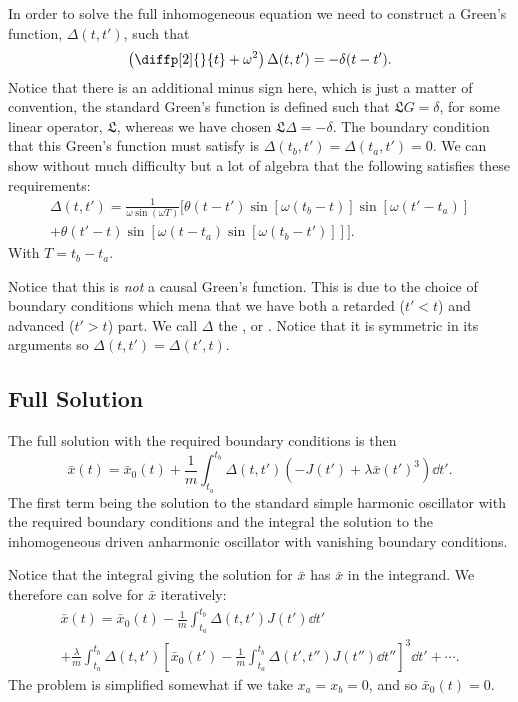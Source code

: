 \documentclass[fleqn]{NotesClass}
\begin{document}
    In order to solve the full inhomogeneous equation we need to construct a Green's function, \(\Delta(t, t')\), such that
    \begin{equation}
        \left( \diffp[2]{}{t} + \omega^2 \right)\Delta(t, t') = -\delta(t - t').
    \end{equation}
    Notice that there is an additional minus sign here, which is just a matter of convention, the standard Green's function is defined such that \(\mathfrak{L}G = \delta\), for some linear operator, \(\mathfrak{L}\), whereas we have chosen \(\mathfrak{L}\Delta = -\delta\).
    The boundary condition that this Green's function must satisfy is \(\Delta(t_b, t') = \Delta(t_a, t') = 0\).
    We can show without much difficulty but a lot of algebra that the following satisfies these requirements:
    \begin{multline}\label{eqn:driven SHO Greens function}
        \Delta(t, t') = \frac{1}{\omega\sin(\omega T)} [\theta(t - t')\sin[\omega(t_b - t)]\sin[\omega(t' - t_a)]\\
        + \theta(t' - t)\sin[\omega(t - t_a)\sin[\omega(t_b - t')]]].
    \end{multline}
    With \(T = t_b - t_a\).
    
    Notice that this is \emph{not} a causal Green's function.
    This is due to the choice of boundary conditions which mena that we have both a retarded (\(t' < t\)) and advanced (\(t' > t\)) part.
    We call \(\Delta\) the , or .
    Notice that it is symmetric in its arguments so \(\Delta(t, t') = \Delta(t', t)\).
    
    \subsection{Full Solution}
    The full solution with the required boundary conditions is then
    \begin{equation}
        \bar{x}(t)= \bar{x}_0(t) + \frac{1}{m} \int_{t_a}^{t_b} \Delta(t, t')(-J(t') + \lambda\bar{x}(t')^3) \dd{t'}.
    \end{equation}
    The first term being the solution to the standard simple harmonic oscillator with the required boundary conditions and the integral the solution to the inhomogeneous driven anharmonic oscillator with vanishing boundary conditions.
    
    Notice that the integral giving the solution for \(\bar{x}\) has \(\bar{x}\) in the integrand.
    We therefore can solve for \(\bar{x}\) iteratively:
    \begin{multline}
        \bar{x}(t) = \bar{x}_0(t) - \frac{1}{m} \int_{t_a}^{t_b} \Delta(t, t') J(t') \dd{t'}\\
        + \frac{\lambda}{m} \int_{t_a}^{t_b} \Delta(t, t')\left[ \bar{x}_0(t') - \frac{1}{m}\int_{t_a}^{t_b} \Delta(t', t'')J(t'') \dd{t''} \right]^3 \dd{t'} + \dotsb.
    \end{multline}
    The problem is simplified somewhat if we take \(x_a = x_b = 0\), and so \(\bar{x}_0(t) = 0\).
    
\end{document}
